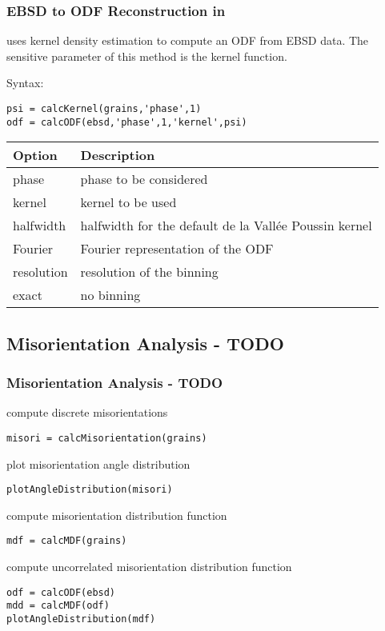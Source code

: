 \documentclass[compress]{beamer}
\begin{document}
\begin{frame}[fragile]
  \frametitle{EBSD to ODF Reconstruction in \MTEX}

  \mtex uses kernel density estimation to compute an ODF from EBSD data. The
  sensitive parameter of this method is the kernel function.

\medskip

  Syntax:
  \begin{alertenv}
\begin{lstlisting}
psi = calcKernel(grains,'phase',1)
odf = calcODF(ebsd,'phase',1,'kernel',psi)
\end{lstlisting}
  \end{alertenv}

\medskip

\begin{tabular}{ll}
  Option & Description \\
  \toprule
  phase & phase to be considered\\
  kernel & kernel to be used\\
  halfwidth & halfwidth for the default de la Vall\'ee Poussin kernel\\
  Fourier & Fourier representation of the ODF\\
  resolution &  resolution of the binning\\
  exact & no binning
\end{tabular}


\end{frame}

\subsection*{Misorientation Analysis - TODO}

\begin{frame}
  \frametitle{Misorientation Analysis - TODO}

  compute discrete misorientations

\begin{lstlisting}
misori = calcMisorientation(grains)
\end{lstlisting}

  \medskip
  \pause

plot misorientation angle distribution
\begin{lstlisting}
plotAngleDistribution(misori)
\end{lstlisting}

  \medskip
  \pause

compute misorientation distribution function
\begin{lstlisting}
mdf = calcMDF(grains)
\end{lstlisting}

  \medskip
  \pause


compute uncorrelated misorientation distribution function
\begin{lstlisting}
odf = calcODF(ebsd)
mdd = calcMDF(odf)
plotAngleDistribution(mdf)
\end{lstlisting}

\end{frame}
\end{document}
